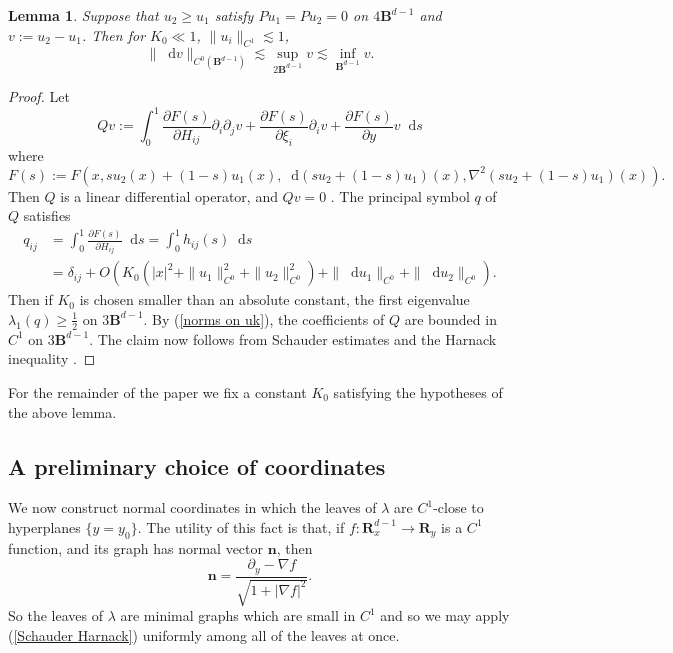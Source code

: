 \documentclass[reqno,11pt]{amsart}
\newcommand{\RR}{\mathbf{R}}
\newcommand{\Ball}{\mathbf{B}}
\newcommand*\dif{\mathop{}\!\mathrm{d}}
\newcommand{\normal}{\mathbf n}
\newtheorem{lemma}[theorem]{Lemma}
\theoremstyle{definition}
\numberwithin{equation}{section}
\begin{document}
\begin{lemma}
Suppose that $u_2 \geq u_1$ satisfy $Pu_1 = Pu_2 = 0$ on $4\Ball^{d - 1}$ and $v := u_2 - u_1$.
Then for $K_0 \ll 1$, $\|u_i\|_{C^1} \lesssim 1$, 
\begin{equation}\label{Schauder Harnack}
	\|\dif v\|_{C^0(\Ball^{d - 1})} \lesssim \sup_{2\Ball^{d - 1}} v \lesssim \inf_{\Ball^{d - 1}} v.
\end{equation}
\end{lemma}
\begin{proof}
Let
$$Qv := \int_0^1 \frac{\partial F(s)}{\partial H_{ij}} \partial_i \partial_j v + \frac{\partial F(s)}{\partial \xi_i} \partial_i v + \frac{\partial F(s)}{\partial y} v \dif s$$
where 
$$F(s) := F(x, su_2(x) + (1 - s)u_1(x), \dif(su_2 + (1 - s) u_1)(x), \nabla^2(su_2 + (1 - s)u_1)(x)).$$
Then $Q$ is a linear differential operator, and $Qv = 0$ \cite[(7.25)]{colding2011course}.
The principal symbol $q$ of $Q$ satisfies
\begin{align*}
q_{ij} &= \int_0^1 \frac{\partial F(s)}{\partial H_{ij}} \dif s = \int_0^1 h_{ij}(s) \dif s \\
&= \delta_{ij} + O(K_0(|x|^2 + \|u_1\|_{C^0}^2 + \|u_2\|_{C^0}^2) + \|\dif u_1\|_{C^0} + \|\dif u_2\|_{C^0}).
\end{align*}
Then if $K_0$ is chosen smaller than an absolute constant, the first eigenvalue $\lambda_1(q) \geq \frac{1}{2}$ on $3\Ball^{d - 1}$.
By (\ref{norms on uk}), the coefficients of $Q$ are bounded in $C^1$ on $3\Ball^{d - 1}$.
The claim now follows from Schauder estimates \cite[Theorem 6.2]{gilbarg2015elliptic} and the Harnack inequality \cite[Corollary 9.25]{gilbarg2015elliptic}.
\end{proof}

For the remainder of the paper we fix a constant $K_0$ satisfying the hypotheses of the above lemma.

\subsection{A preliminary choice of coordinates}
We now construct normal coordinates in which the leaves of $\lambda$ are $C^1$-close to hyperplanes $\{y = y_0\}$.
The utility of this fact is that, if $f: \RR^{d - 1}_x \to \RR_y$ is a $C^1$ function, and its graph has normal vector $\normal$, then
\begin{equation}\label{nabla as a normal}
	\normal = \frac{\partial_y - \nabla f}{\sqrt{1 + |\nabla f|^2}}.
\end{equation}
So the leaves of $\lambda$ are minimal graphs which are small in $C^1$ and so we may apply (\ref{Schauder Harnack}) uniformly among all of the leaves at once.
\end{document}
